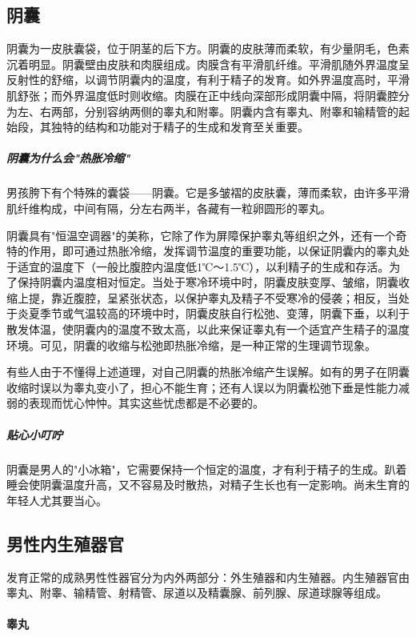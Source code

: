 \begin{enumerate}
\subsection{阴囊}

阴囊为一皮肤囊袋，位于阴茎的后下方。阴囊的皮肤薄而柔软，有少量阴毛，色素沉着明显。阴囊壁由皮肤和肉膜组成。肉膜含有平滑肌纤维。平滑肌随外界温度呈反射性的舒缩，以调节阴囊内的温度，有利于精子的发育。如外界温度高时，平滑肌舒张；而外界温度低时则收缩。肉膜在正中线向深部形成阴囊中隔，将阴囊腔分为左、右两部，分别容纳两侧的睾丸和附睾。阴囊内含有睾丸、附睾和输精管的起始段，其独特的结构和功能对于精子的生成和发育至关重要。

\subparagraph{阴囊为什么会"热胀冷缩"}

男孩胯下有个特殊的囊袋——阴囊。它是多皱褶的皮肤囊，薄而柔软，由许多平滑肌纤维构成，中间有隔，分左右两半，各藏有一粒卵圆形的睪丸。

阴囊具有"恒温空调器"的美称，它除了作为屏障保护睾丸等组织之外，还有一个奇特的作用，即可通过热胀冷缩，发挥调节温度的重要功能，以保证阴囊内的睾丸处于适宜的温度下（一般比腹腔内温度低1℃～1.5℃），以利精子的生成和存活。为了保持阴囊内温度相对恒定。当处于寒冷环境中时，阴囊皮肤变厚、皱缩，阴囊收缩上提，靠近腹腔，呈紧张状态，以保护睾丸及精子不受寒冷的侵袭；相反，当处于炎夏季节或气温较高的环境中时，阴囊皮肤自行松弛、变薄，阴囊下垂，以利于散发体温，使阴囊内的温度不致太高，以此来保证睾丸有一个适宜产生精子的温度环境。可见，阴囊的收缩与松弛即热胀冷缩，是一种正常的生理调节现象。

有些人由于不懂得上述道理，对自己阴囊的热胀冷缩产生误解。如有的男子在阴囊收缩时误以为睾丸变小了，担心不能生育；还有人误以为阴囊松弛下垂是性能力减弱的表现而忧心忡忡。其实这些忧虑都是不必要的。

\subparagraph{贴心小叮咛}

阴囊是男人的"小冰箱"，它需要保持一个恒定的温度，才有利于精子的生成。趴着睡会使阴囊温度升高，又不容易及时散热，对精子生长也有一定影响。尚未生育的年轻人尤其要当心。

\subsection{男性内生殖器官}

发育正常的成熟男性性器官分为内外两部分：外生殖器和内生殖器。内生殖器官由睾丸、附睾、输精管、射精管、尿道以及精囊腺、前列腺、尿道球腺等组成。

\paragraph{睾丸}


\end{enumerate}

